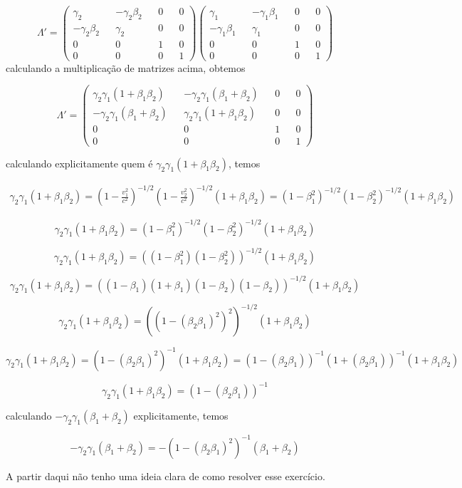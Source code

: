 \documentclass[10pt,a4paper]{article}
\begin{document}
 \begin{equation}\nonumber
 	\Lambda' = \left(\begin{matrix}
 		\gamma_2&&-\gamma_2\beta_2&&0&&0\\
 		-\gamma_2\beta_2&&\gamma_2&&0&&0\\
 		0&&0&&1&&0\\
 		0&&0&&0&&1
 	\end{matrix}\right)\left(\begin{matrix}
 		\gamma_1&&-\gamma_1\beta_1&&0&&0\\
 		-\gamma_1\beta_1&&\gamma_1&&0&&0\\
 		0&&0&&1&&0\\
 		0&&0&&0&&1
 	\end{matrix}\right)
 \end{equation}
calculando a multiplicação de matrizes acima, obtemos


\begin{equation}\nonumber
	\Lambda' = \left(\begin{matrix}
		\gamma_2\gamma_1(1+\beta_1\beta_2)&&-\gamma_2\gamma_1(\beta_1+\beta_2)&&0&&0\\
		-\gamma_2\gamma_1(\beta_1+\beta_2)&&\gamma_2\gamma_1(1+\beta_1\beta_2)&&0&&0\\
		0&&0&&1&&0\\
		0&&0&&0&&1
	\end{matrix}\right)
\end{equation}

calculando explicitamente quem é $ \gamma_2\gamma_1(1+\beta_1\beta_2) $, temos

\begin{eqnarray}
	\gamma_2\gamma_1(1+\beta_1\beta_2) = \left(1 -\frac{v_1^2}{c^2}\right)^{-1/2}\left(1 -\frac{v_2^2}{c^2}\right)^{-1/2}(1+\beta_1\beta_2) = \left(1 -\beta_1^2\right)^{-1/2}\left(1 -\beta_2^2\right)^{-1/2}(1+\beta_1\beta_2) \nonumber 
\end{eqnarray}

$$\gamma_2\gamma_1(1+\beta_1\beta_2) =\left(1 -\beta_1^2\right)^{-1/2}\left(1 -\beta_2^2\right)^{-1/2}(1+\beta_1\beta_2)$$

$$\gamma_2\gamma_1(1+\beta_1\beta_2) =\left(\left(1 -\beta_1^2\right)\left(1 -\beta_2^2\right)\right)^{-1/2}(1+\beta_1\beta_2)$$

$$\gamma_2\gamma_1(1+\beta_1\beta_2) =\left(\left(1 -\beta_1\right)\left(1 +\beta_1\right)\left(1 -\beta_2\right)\left(1 -\beta_2\right)\right)^{-1/2}(1+\beta_1\beta_2)$$

$$\gamma_2\gamma_1(1+\beta_1\beta_2) =\left((1 -(\beta_2\beta_1)^2)^2\right)^{-1/2}(1+\beta_1\beta_2)$$

$$\gamma_2\gamma_1(1+\beta_1\beta_2) =(1 -(\beta_2\beta_1)^2)^{-1}(1+\beta_1\beta_2)= (1 -(\beta_2\beta_1))^{-1}(1 +(\beta_2\beta_1))^{-1}(1+\beta_1\beta_2)$$

$$\gamma_2\gamma_1(1+\beta_1\beta_2) = (1 -(\beta_2\beta_1))^{-1}$$

calculando $-\gamma_2\gamma_1(\beta_1+\beta_2)  $ explicitamente, temos

$$-\gamma_2\gamma_1(\beta_1+\beta_2)=- (1 -(\beta_2\beta_1)^2)^{-1} (\beta_1+\beta_2)$$

A partir daqui não tenho uma ideia clara de como resolver esse exercício.
\end{document}
